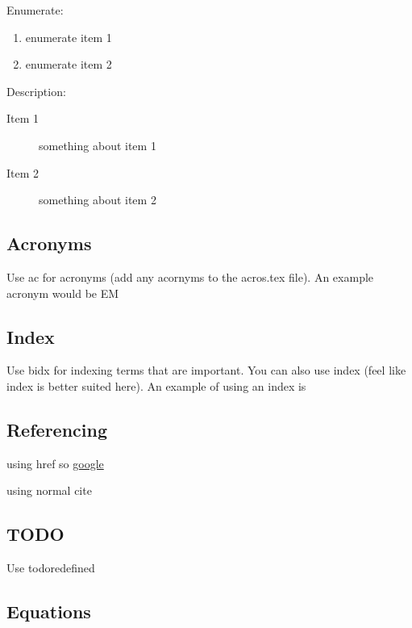 Enumerate:

\begin{enumerate}
	\item enumerate item 1
	\item enumerate item 2
\end{enumerate}

Description:

\begin{description}
	\item[Item 1] something about item 1
	\item[Item 2] something about item 2
\end{description}

\subsection{Acronyms}

Use ac for acronyms (add any acornyms to the acros.tex file).
An example acronym would be \ac{EM}

\subsection{Index}

Use bidx for indexing terms that are important.
You can also use index (feel like index is better suited here).
An example of using an index is 

\subsection{Referencing}

\begin{compactitem}
	\item using href so \href{www.google.com}{google}
	\item using normal cite \cite{marr_aa_2010}
\end{compactitem}

\subsection{TODO}

Use todoredefined


\subsection{Equations}

